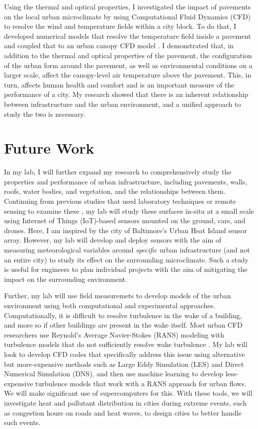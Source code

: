 \documentclass[12pt]{article}
\begin{document}
Using the thermal and optical properties, I investigated the impact of pavements on the local urban microclimate by using Computational Fluid Dynamics (CFD) to resolve the wind and temperature fields within a city block. To do that, I developed numerical models that resolve the temperature field inside a pavement \cite{sen2017microscale} and coupled that to an urban canopy CFD model \cite{sen2017uncoupled}. I demonstrated that, in addition to the thermal and optical properties of the pavement, the configuration of the urban form around the pavement, as well as environmental conditions on a larger scale, affect the canopy-level air temperature above the pavement. This, in turn, affects human health and comfort and is an important measure of the performance of a city. My research showed that there is an inherent relationship between infrastructure and the urban environment, and a unified approach to study the two is necessary.

\section*{Future Work}
In my lab, I will further expand my research to comprehensively study the properties and performance of urban infrastructure, including pavements, walls, roofs, water bodies, and vegetation, and the relationships between them. Continuing from previous studies that used laboratory techniques or remote sensing to examine these \cite{berdahl1997preliminary, niachou2001analysis, sun2012can, gallo1993use}, my lab will study these surfaces in-situ at a small scale using Internet of Things (IoT)-based sensors mounted on the ground, cars, and drones. Here, I am inspired by the city of Baltimore's Urban Heat Island sensor array. However, my lab will develop and deploy sensors with the aim of measuring meteorological variables around \textit{specific} urban infrastructure (and not an entire city) to study its effect on the surrounding microclimate. Such a study is useful for engineers to plan individual projects with the aim of mitigating the impact on the surrounding environment. 

Further, my lab will use field measuremets to develop models of the urban environment using both computational and experimental approaches. Computationally, it is difficult to resolve turbulence in the wake of a building, and more so if other buildings are present in the wake itself. Most urban CFD researchers use Reynold's Average Navier-Stokes (RANS) modeling with turbulence models that do not sufficiently resolve wake turbulence \cite{blocken2015computational}. My lab will look to develop CFD codes that specifically address this issue using alternative but more-expensive methods such as Large Eddy Simulation (LES) and Direct Numerical Simulation (DNS), and then use machine learning to develop less-expensive turbulence models that work with a RANS approach for urban flows. We will make significant use of supercomputers for this. With these tools, we will investigate heat and pollutant distribution in cities during extreme events, such as congestion hours on roads and heat waves, to design cities to better handle such events.
\end{document}
